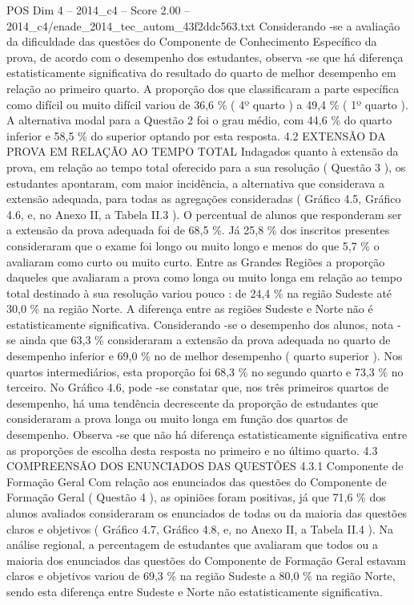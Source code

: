 \begin{textsample}{POS Dim 4 – 2014\_c4 – Score 2.00 – 2014\_c4/enade\_2014\_tec\_autom\_43f2ddc563.txt}
Considerando -se a avaliação da dificuldade das questões do Componente de Conhecimento Específico da prova, de acordo com o desempenho dos estudantes, observa -se que há diferença estatisticamente significativa do resultado do quarto de melhor desempenho em relação ao primeiro quarto.
A proporção dos que classificaram a parte específica como difícil ou muito difícil variou de 36,6 \% ( 4º quarto ) a 49,4 \% ( 1º quarto ).
A alternativa modal para a Questão 2 foi o grau médio, com 44,6 \% do quarto inferior e 58,5 \% do superior optando por esta resposta. 4.2 EXTENSÃO DA PROVA EM RELAÇÃO AO TEMPO TOTAL Indagados quanto à extensão da prova, em relação ao tempo total oferecido para a sua resolução ( Questão 3 ), os estudantes apontaram, com maior incidência, a alternativa que considerava a extensão adequada, para todas as agregações consideradas ( Gráfico 4.5, Gráfico 4.6, e, no Anexo II, a Tabela II.3 ).
O percentual de alunos que responderam ser a extensão da prova adequada foi de 68,5 \%.
Já 25,8 \% dos inscritos presentes consideraram que o exame foi longo ou muito longo e menos do que 5,7 \% o avaliaram como curto ou muito curto.
Entre as Grandes Regiões a proporção daqueles que avaliaram a prova como longa ou muito longa em relação ao tempo total destinado à sua resolução variou pouco : de 24,4 \% na região Sudeste até 30,0 \% na região Norte.
A diferença entre as regiões Sudeste e Norte não é estatisticamente significativa.
Considerando -se o desempenho dos alunos, nota -se ainda que 63,3 \% consideraram a extensão da prova adequada no quarto de desempenho inferior e 69,0 \% no de melhor desempenho ( quarto superior ).
Nos quartos intermediários, esta proporção foi 68,3 \% no segundo quarto e 73,3 \% no terceiro.
No Gráfico 4.6, pode -se constatar que, nos três primeiros quartos de desempenho, há uma tendência decrescente da proporção de estudantes que consideraram a prova longa ou muito longa em função dos quartos de desempenho.
Observa -se que não há diferença estatisticamente significativa entre as proporções de escolha desta resposta no primeiro e no último quarto. 4.3 COMPREENSÃO DOS ENUNCIADOS DAS QUESTÕES 4.3.1 Componente de Formação Geral Com relação aos enunciados das questões do Componente de Formação Geral ( Questão 4 ), as opiniões foram positivas, já que 71,6 \% dos alunos avaliados consideraram os enunciados de todas ou da maioria das questões claros e objetivos ( Gráfico 4.7, Gráfico 4.8, e, no Anexo II, a Tabela II.4 ).
Na análise regional, a percentagem de estudantes que avaliaram que todos ou a maioria dos enunciados das questões do Componente de Formação Geral estavam claros e objetivos variou de 69,3 \% na região Sudeste a 80,0 \% na região Norte, sendo esta diferença entre Sudeste e Norte não estatisticamente significativa.

\end{textsample}
